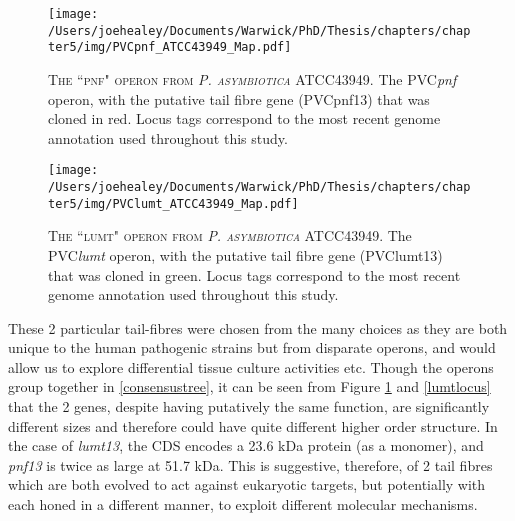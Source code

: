 \vspace{0.1cm}
\begin{figure}[h]
	\centering
	\texttt{[image: /Users/joehealey/Documents/Warwick/PhD/Thesis/chapters/chapter5/img/PVCpnf\_ATCC43949\_Map.pdf]}
	\captionsetup{singlelinecheck=off, justification=justified, font=footnotesize, aboveskip=5pt}
	\caption[PVCpnf operon map identifying cloned PVCpnf13 protein]{\textsc{\normalsize The ``pnf" operon from \emph{P. asymbiotica} ATCC43949.}\vspace{0.1cm} \newline The PVC\emph{pnf} operon, with the putative tail fibre gene (PVCpnf13) that was cloned in red. Locus tags correspond to the most recent genome annotation used throughout this study.}
	\label{pnflocus}
\end{figure}
\vspace{-0.7cm}
\begin{figure}[h]
	\centering
	\texttt{[image: /Users/joehealey/Documents/Warwick/PhD/Thesis/chapters/chapter5/img/PVClumt\_ATCC43949\_Map.pdf]}
	\captionsetup{singlelinecheck=off, justification=justified, font=footnotesize, aboveskip=10pt}
	\caption[PVClumt operon map identifying cloned PVClumt13 protein]{\textsc{\normalsize The ``lumt" operon from \emph{P. asymbiotica} ATCC43949.}\vspace{0.1cm} \newline The PVC\emph{lumt} operon, with the putative tail fibre gene (PVClumt13) that was cloned in green. Locus tags correspond to the most recent genome annotation used throughout this study.}
	\label{lumtlocus}
\end{figure}

These 2 particular tail-fibres were chosen from the many choices as they are both unique to the human pathogenic strains but from disparate operons, and would allow us to explore differential tissue culture activities etc. Though the operons group together in \vref{consensustree}, it can be seen from Figure \ref{pnflocus} and \vref{lumtlocus} that the 2 genes, despite having putatively the same function, are significantly different sizes and therefore could have quite different higher order structure. In the case of \emph{lumt13}, the CDS encodes a 23.6 kDa protein (as a monomer), and \emph{pnf13} is twice as large at 51.7 kDa. This is suggestive, therefore, of 2 tail fibres which are both evolved to act against eukaryotic targets, but potentially with each honed in a different manner, to exploit different molecular mechanisms.

